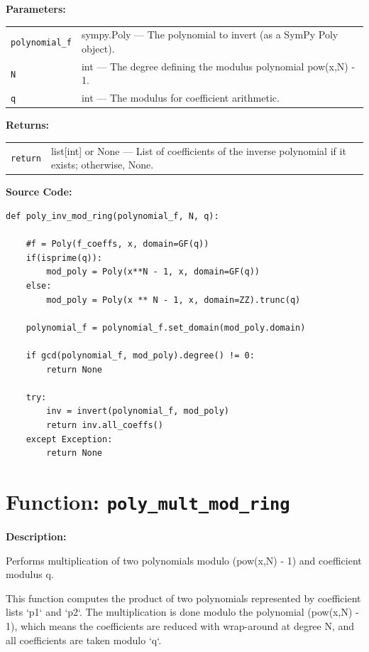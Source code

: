 \documentclass[a4paper,12pt]{article}
\begin{document}
\vspace{1em}

\textbf{Parameters:}

\vspace{1em}
\noindent
\begin{tabular}{p{3cm} p{11cm}}
\texttt{polynomial\_f} & sympy.Poly — The polynomial to invert (as a SymPy Poly object). \\
\texttt{N} & int — The degree defining the modulus polynomial pow(x,N) - 1. \\
\texttt{q} & int — The modulus for coefficient arithmetic. \\
\end{tabular}

\vspace{1em}
\noindent
\textbf{Returns:}

\begin{tabular}{p{3cm} p{11cm}}
\texttt{return} & list[int] or None — List of coefficients of the inverse polynomial if it exists; otherwise, None. \\
\end{tabular}

\vspace{1em}
\textbf{Source Code:}

\begin{lstlisting}
def poly_inv_mod_ring(polynomial_f, N, q):

    #f = Poly(f_coeffs, x, domain=GF(q))
    if(isprime(q)):
        mod_poly = Poly(x**N - 1, x, domain=GF(q))
    else:
        mod_poly = Poly(x ** N - 1, x, domain=ZZ).trunc(q)

    polynomial_f = polynomial_f.set_domain(mod_poly.domain)

    if gcd(polynomial_f, mod_poly).degree() != 0:
        return None

    try:
        inv = invert(polynomial_f, mod_poly)
        return inv.all_coeffs()
    except Exception:
        return None
\end{lstlisting}

\section*{Function: \texttt{poly\_mult\_mod\_ring}}

\textbf{Description:}

Performs multiplication of two polynomials modulo (pow(x,N) - 1) and coefficient modulus q.

This function computes the product of two polynomials represented by coefficient lists `p1` and `p2`.
The multiplication is done modulo the polynomial (pow(x,N) - 1), which means the coefficients
are reduced with wrap-around at degree N, and all coefficients are taken modulo `q`.
\end{document}

